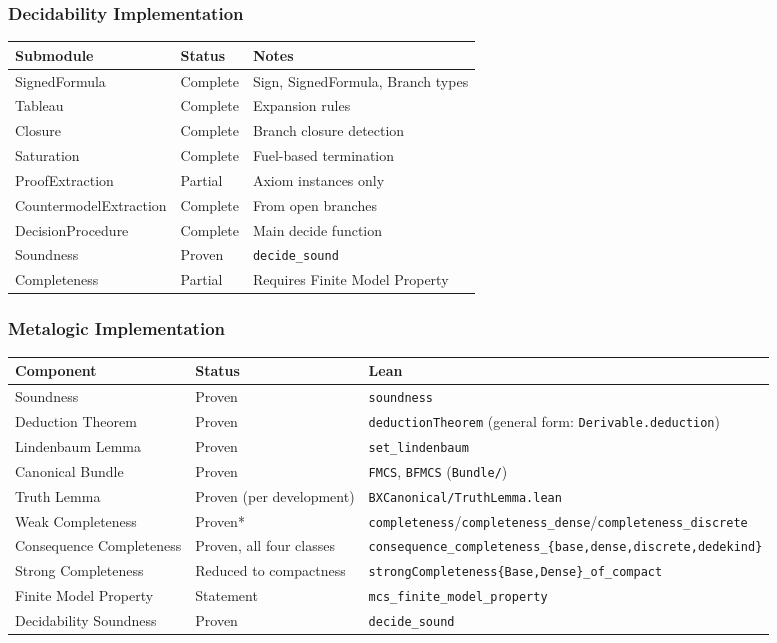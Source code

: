 \documentclass[../BimodalReference.tex]{subfiles}
\begin{document}
\subsubsection{Decidability Implementation}

\begin{center}
\begin{tabular}{@{}lll@{}}
\toprule
Submodule & Status & Notes \\
\midrule
SignedFormula & Complete & Sign, SignedFormula, Branch types \\
Tableau & Complete & Expansion rules \\
Closure & Complete & Branch closure detection \\
Saturation & Complete & Fuel-based termination \\
ProofExtraction & Partial & Axiom instances only \\
CountermodelExtraction & Complete & From open branches \\
DecisionProcedure & Complete & Main decide function \\
Soundness & Proven & \texttt{decide\_sound} \\
Completeness & Partial & Requires Finite Model Property \\
\bottomrule
\end{tabular}
\end{center}

\subsubsection{Metalogic Implementation}

\begin{center}
\begin{tabular}{@{}lll@{}}
\toprule
Component & Status & Lean \\
\midrule
Soundness & Proven & \texttt{soundness} \\
Deduction Theorem & Proven & \texttt{deductionTheorem} (general form: \texttt{Derivable.deduction}) \\
Lindenbaum Lemma & Proven & \texttt{set\_lindenbaum} \\
Canonical Bundle & Proven & \texttt{FMCS}, \texttt{BFMCS} (\texttt{Bundle/}) \\
Truth Lemma & Proven (per development) & \texttt{BXCanonical/TruthLemma.lean} \\
Weak Completeness & Proven* & \texttt{completeness}/\texttt{completeness\_dense}/\texttt{completeness\_discrete} \\
Consequence Completeness & Proven, all four classes & \texttt{consequence\_completeness\_\{base,dense,discrete,dedekind\}} \\
Strong Completeness & Reduced to compactness & \texttt{strongCompleteness\{Base,Dense\}\_of\_compact} \\
Finite Model Property & Statement & \texttt{mcs\_finite\_model\_property} \\
Decidability Soundness & Proven & \texttt{decide\_sound} \\
\bottomrule
\end{tabular}
\end{center}
\end{document}
